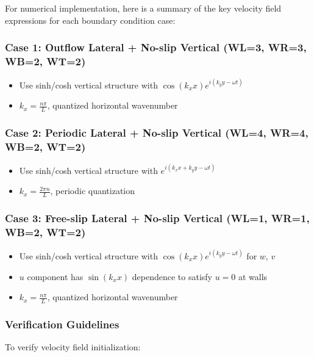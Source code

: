 \documentclass[12pt,a4paper]{article}
\begin{document}
For numerical implementation, here is a summary of the key velocity field expressions for each boundary condition case:

\subsubsection{Case 1: Outflow Lateral + No-slip Vertical (WL=3, WR=3, WB=2, WT=2)}
\begin{itemize}
    \item Use sinh/cosh vertical structure with $\cos(k_x x) e^{i(k_y y - \omega t)}$
    \item $k_x = \frac{n\pi}{L}$, quantized horizontal wavenumber
\end{itemize}

\subsubsection{Case 2: Periodic Lateral + No-slip Vertical (WL=4, WR=4, WB=2, WT=2)}
\begin{itemize}
    \item Use sinh/cosh vertical structure with $e^{i(k_x x + k_y y - \omega t)}$
    \item $k_x = \frac{2\pi n}{L}$, periodic quantization
\end{itemize}

\subsubsection{Case 3: Free-slip Lateral + No-slip Vertical (WL=1, WR=1, WB=2, WT=2)}
\begin{itemize}
    \item Use sinh/cosh vertical structure with $\cos(k_x x) e^{i(k_y y - \omega t)}$ for $w$, $v$
    \item $u$ component has $\sin(k_x x)$ dependence to satisfy $u = 0$ at walls
    \item $k_x = \frac{n\pi}{L}$, quantized horizontal wavenumber
\end{itemize}

\subsubsection{Verification Guidelines}

To verify velocity field initialization:
\end{document}
